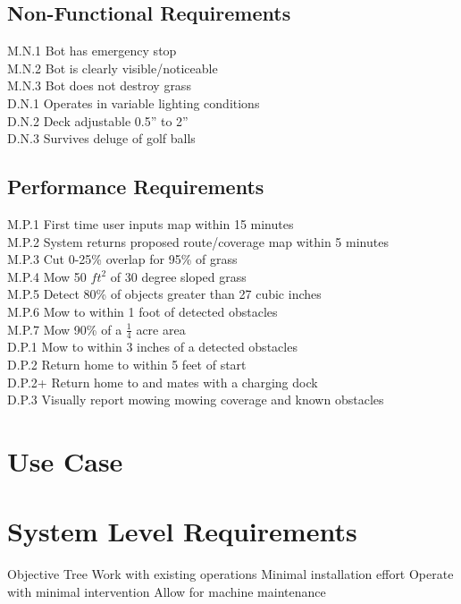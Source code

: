 \documentclass{article}
\begin{document}
\subsection{Non-Functional Requirements}
M.N.1 Bot has emergency stop \\
M.N.2 Bot is clearly visible/noticeable \\
M.N.3 Bot does not destroy grass \\
D.N.1 Operates in variable lighting conditions \\
D.N.2 Deck adjustable 0.5” to 2” \\
D.N.3 Survives deluge of golf balls \\


\subsection{Performance Requirements}
M.P.1 First time user inputs map within 15 minutes \\
M.P.2 System returns proposed route/coverage map within 5 minutes \\
M.P.3 Cut 0-25\% overlap for 95\% of grass \\
M.P.4 Mow 50 $ft^2$ of 30 degree sloped grass \\
M.P.5 Detect 80\% of objects greater than 27 cubic inches \\
M.P.6 Mow to within 1 foot of detected obstacles \\
M.P.7 Mow 90\% of a $\frac{1}{4}$ acre area \\

\noindent
D.P.1 Mow to within 3 inches of a detected obstacles \\
D.P.2 Return home to within 5 feet of start \\
D.P.2+ Return home to and mates with a charging dock \\
D.P.3 Visually report mowing mowing coverage and known obstacles \\

\section{Use Case}

\section{System Level Requirements}
Objective Tree
Work with existing operations
  Minimal installation effort
  Operate with minimal intervention
  Allow for machine maintenance
\end{document}
